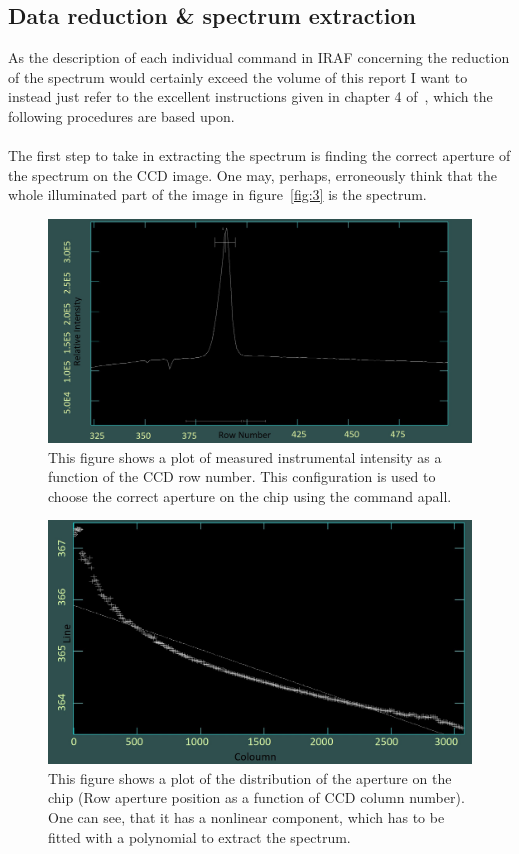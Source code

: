 \documentclass{article}
\begin{document}
\subsection{Data reduction \& spectrum extraction}
\label{ss:2}
As the description of each individual command in IRAF concerning the reduction of the spectrum would certainly exceed the volume of this report I want to instead just refer to the excellent instructions given in chapter 4 of~\parencite{IRAF_Manual}, which the following procedures are based upon.\\\\The first step to take in extracting the spectrum is finding the correct aperture of the spectrum on the CCD image. One may, perhaps, erroneously think that the whole illuminated part of the image in figure~\ref{fig:3} is the spectrum.
\begin{figure}[H]
  	\centering
    \includegraphics[width=1.00\textwidth]{spectroscopy/aperture_choosing.jpg}
  	\caption{This figure shows a plot of measured instrumental intensity as a function of the CCD row number. This configuration is used to choose the correct aperture on the chip using the command \ldq apall\rdq.}
  	\label{fig:4}
\end{figure}
\begin{figure}[H]
	\centering
    \includegraphics[width=1.00\textwidth]{spectroscopy/aperture_fitting.jpg}
  	\caption{This figure shows a plot of the distribution of the aperture on the chip (Row aperture position as a function of CCD column number). One can see, that it has a nonlinear component, which has to be fitted with a polynomial to extract the spectrum.}
  	\label{fig:5}
\end{figure}
\end{document}
